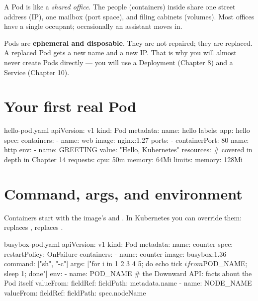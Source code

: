 \begin{analogy}
A Pod is like a \emph{shared office}. The people (containers) inside share one
street address (IP), one mailbox (port space), and filing cabinets (volumes).
Most offices have a single occupant; occasionally an assistant moves in.
\end{analogy}

\begin{keyidea}
Pods are \textbf{ephemeral and disposable}. They are not repaired; they are
replaced. A replaced Pod gets a new name and a new IP. That is why you will
almost never create Pods directly --- you will use a Deployment (Chapter 8)
and a Service (Chapter 10).
\end{keyidea}

\section{Your first real Pod}

\begin{yamlcode}{hello-pod.yaml}
apiVersion: v1
kind: Pod
metadata:
  name: hello
  labels:
    app: hello
spec:
  containers:
    - name: web
      image: nginx:1.27
      ports:
        - containerPort: 80
          name: http
      env:
        - name: GREETING
          value: "Hello, Kubernetes"
      resources:              # covered in depth in Chapter 14
        requests:
          cpu: 50m
          memory: 64Mi
        limits:
          memory: 128Mi
\end{yamlcode}


\section{Command, args, and environment}

Containers start with the image's  and . In Kubernetes
you can override them:  replaces , 
replaces .

\begin{yamlcode}{busybox-pod.yaml}
apiVersion: v1
kind: Pod
metadata:
  name: counter
spec:
  restartPolicy: OnFailure
  containers:
    - name: counter
      image: busybox:1.36
      command: ["sh", "-c"]
      args: ["for i in 1 2 3 4 5; do echo tick $i from $POD_NAME; sleep 1; done"]
      env:
        - name: POD_NAME              # the Downward API: facts about the Pod itself
          valueFrom:
            fieldRef:
              fieldPath: metadata.name
        - name: NODE_NAME
          valueFrom:
            fieldRef:
              fieldPath: spec.nodeName
\end{yamlcode}

